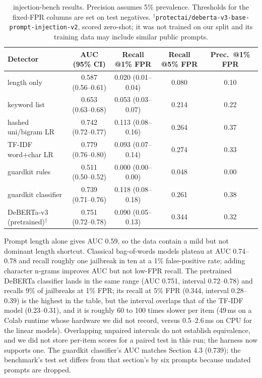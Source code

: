 \documentclass[11pt]{article}
\begin{document}
\begin{table}[h]\centering\small
\begin{tabular}{lcccc}\toprule
Detector & AUC (95\% CI) & Recall @1\% FPR & Recall @5\% FPR & Prec.\ @1\% FPR\\\midrule
length only & 0.587 (0.56--0.61) & 0.020 (0.01--0.04) & 0.080 & 0.10\\
keyword list & 0.653 (0.63--0.68) & 0.053 (0.03--0.07) & 0.214 & 0.22\\
hashed uni/bigram LR & 0.742 (0.72--0.77) & 0.113 (0.08--0.16) & 0.264 & 0.37\\
TF-IDF word+char LR & 0.779 (0.76--0.80) & 0.093 (0.07--0.14) & 0.274 & 0.33\\
guardkit rules & 0.511 (0.50--0.52) & 0.000 (0.00--0.00) & 0.048 & 0.00\\
guardkit classifier & 0.739 (0.71--0.76) & 0.118 (0.08--0.18) & 0.261 & 0.38\\
DeBERTa-v3 (pretrained)$^{\dagger}$ & 0.751 (0.72--0.78) & 0.090 (0.05--0.13) & 0.344 & 0.32\\\bottomrule
\end{tabular}
\caption{injection-bench results. Precision assumes 5\% prevalence. Thresholds for the fixed-FPR columns are set on test negatives. $^{\dagger}$\texttt{protectai/deberta-v3-base-prompt-injection-v2}, scored zero-shot; it was not trained on our split and its training data may include similar public prompts.}\label{tab:bench}
\end{table}
Prompt length alone gives AUC 0.59, so the data contain a mild but not dominant length shortcut. Classical bag-of-words models plateau at AUC 0.74--0.78 and recall roughly one jailbreak in ten at a 1\% false-positive rate; adding character n-grams improves AUC but not low-FPR recall. The pretrained DeBERTa classifier lands in the same range (AUC 0.751, interval 0.72--0.78) and recalls 9\% of jailbreaks at 1\% FPR; its recall at 5\% FPR (0.344, interval 0.28--0.39) is the highest in the table, but the interval overlaps that of the TF-IDF model (0.23--0.31), and it is roughly 60 to 100 times slower per item (49\,ms on a Colab runtime whose hardware we did not record, versus 0.5--2.6\,ms on CPU for the linear models). Overlapping unpaired intervals do not establish equivalence, and we did not store per-item scores for a paired test in this run; the harness now supports one. The guardkit classifier's AUC matches Section 4.3 (0.739); the benchmark's test set differs from that section's by six prompts because undated prompts are dropped.
\end{document}
